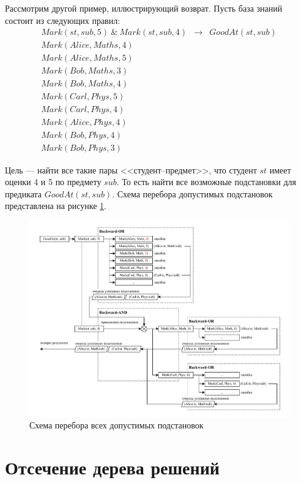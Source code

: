 Рассмотрим другой пример, иллюстрирующий возврат. Пусть база знаний состоит из следующих правил:
\begin{eqnarray}
Mark(st, sub, 5) ~\&~ Mark(st, sub, 4) &\rightarrow& GoodAt(st, sub) \\
Mark(Alice, Maths, 4) \\
Mark(Alice, Maths, 5) \\
Mark(Bob, Maths, 3) \\
Mark(Bob, Maths, 4) \\
Mark(Carl, Phys, 5) \\
Mark(Carl, Phys, 4) \\
Mark(Alice, Phys, 4) \\
Mark(Bob, Phys, 4) \\
Mark(Bob, Phys, 3)
\end{eqnarray}

Цель --- найти все такие пары <<студент--предмет>>, что студент $st$ имеет оценки 4 и 5 по предмету $sub$. То есть найти все возможные подстановки для предиката $GoodAt(st, sub)$. Схема перебора допустимых подстановок представлена на рисунке \ref{fig:ask2}.

\begin{figure}[ht!]
  \centering
  \includegraphics[width=\linewidth]{backward-ask-2.pdf}
  \caption{Схема перебора всех допустимых подстановок}
  \label{fig:ask2}
\end{figure}

\section{Отсечение дерева решений}

